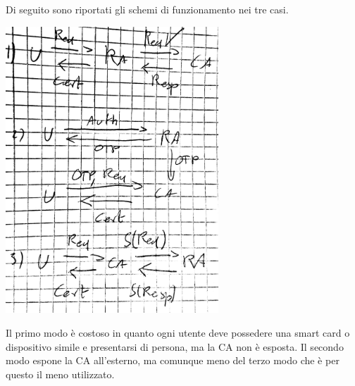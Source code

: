 \documentclass[answers, a4paper, 11pt]{exam}
\begin{document}
\begin{questions}
\begin{parts}
\begin{solution}
Di seguito sono riportati gli schemi di funzionamento nei tre casi.

\includegraphics[width=0.6\textwidth]{certauth}

Il primo modo è costoso in quanto ogni utente deve possedere una smart card o dispositivo simile e presentarsi di persona, ma la CA non è esposta.
Il secondo modo espone la CA all'esterno, ma comunque meno del terzo modo che è per questo il meno utilizzato.
\end{solution}

\end{parts}
\end{questions}
\end{document}
